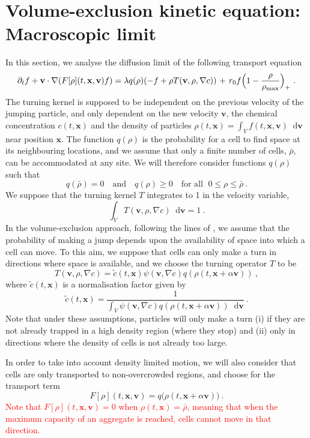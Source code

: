 \documentclass[review,onefignum,onetabnum]{siamart220329}
\newcommand {\bv} { {\mathbf{v}} }
\newcommand {\bx} { {\mathbf{x}} }
\newcommand*\diff{\mathop{}\!\mathrm{d}}
\begin{document}
\section{Volume-exclusion kinetic equation: Macroscopic limit}
\label{sec:model}
In this section, we analyse the diffusion limit of the following transport equation
\begin{equation*}
    \partial_t f+\mathbf{v}\cdot \nabla(F[\rho](t,\mathbf{x},\mathbf{v}) f)= \lambda q(\rho)(-f+\rho T(\mathbf{v},\rho,\nabla c)){\ +\ r_0f\Bigl(1-\frac{\rho}{\rho_{\textnormal{max}}} \Bigr)_+}\ .
\end{equation*}
The turning kernel is supposed to be independent on the previous velocity of the jumping particle, and only dependent on the new velocity $\mathbf{v}$, the chemical concentration $c(t,\mathbf{x})$ and the density of particles $\rho(t,\mathbf{x})=\int_V f(t,\textbf{x},\mathbf{v})\diff \mathbf{v}$ near position $\mathbf{x}$.
\noindent The function $q(\rho)$ is the probability {for a cell to find} space at its neighbouring locations, and we assume that only a finite number of cells, $\bar{\rho}$, can be accommodated at any site. We will therefore consider functions $q(\rho)$ such that
$$
q(\bar{\rho}) = 0 \quad \text{and} \quad q(\rho) \geq 0 \quad \text{for all } \; 0\leq \rho \leq \bar{\rho}\ .
$$
We {suppose that the turning kernel $T$ integrates to 1 in the velocity variable},
$$
\int_V T(\textbf{v},\rho,\nabla c)\diff \mathbf{v}=1\ .
$$
In the volume-exclusion approach, following the lines of \cite{Hillen2009}, we assume that the probability of making a jump depends upon the availability of space into which {{a cell}} can move. To this aim, we suppose that cells can only make a turn in directions where space is available, and we choose the turning operator $T$ to be
\begin{equation*}
    T(\mathbf{v},\rho,\nabla c)=\tilde{c}(t,\mathbf{x})\psi(\mathbf{v},\nabla c) q(\rho(t,\mathbf{x}+ \alpha \mathbf{v}))\ ,
\end{equation*}
\noindent where $\tilde{c}(t,\mathbf{x})$ is a normalisation factor given by
\[
\tilde{c}(t,\mathbf{x})=\frac{1}{\displaystyle\int_{V} \psi(\mathbf{v},\nabla c) q(\rho(t,\mathbf{x}+ \alpha \mathbf{v}))\diff \mathbf{v} }\ .
\]
\noindent Note that under these assumptions, particles will only make a turn (i) if they are not already trapped in a high density region (where they stop) and (ii) only in directions where the density of cells is not already too large. 

In order to take into account density limited motion, we will also consider that cells are only transported to non-overcrowded regions, and choose for the transport term
\begin{equation*}
F[\rho](t,\mathbf{x},\mathbf{v}) = q\big(\rho(t,\mathbf{x}+\alpha \mathbf{v})\big)\ .
\end{equation*}
\textcolor{red}{Note that $F[\rho](t,\bx,\bv)=0$ when $\rho(t,\bx)=\bar{\rho}$, meaning that when the maximum capacity of an aggregate is reached, cells cannot move in that direction.}
\end{document}
